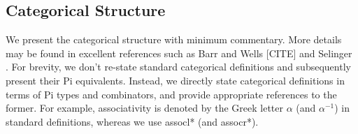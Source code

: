 \documentclass[preprint]{sigplanconf}
\begin{document}


\subsection{Categorical Structure}

We present the categorical structure with minimum commentary. More
details may be found in excellent references such as Barr and Wells
[CITE] and Selinger \cite{springerlink:10.1007/978-3-642-12821-94}.
For brevity, we don't re-state standard categorical definitions and
subsequently present their {{Pi}} equivalents. Instead, we directly
state categorical definitions in terms of {{Pi}} types and
combinators, and provide appropriate references to the former. For
example, associativity is denoted by the Greek letter $\alpha$ (and
$\alpha^{-1}$) in standard definitions, whereas we use {{assocl*}}
(and {{assocr*}}).
\end{document}

